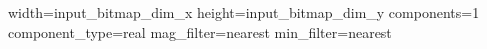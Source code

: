 width={{input_bitmap_dim_x}}
height={{input_bitmap_dim_y}}
components=1
component_type=real
mag_filter=nearest
min_filter=nearest
